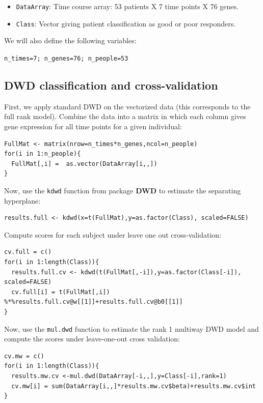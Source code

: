 \documentclass[]{article}
\begin{document}
\begin{itemize}
\itemsep1pt\parskip0pt
\item
  \texttt{DataArray}: Time course array: 53 patients X 7 time points X
  76 genes.
\item
  \texttt{Class}: Vector giving patient classification as good or poor
  responders.
\end{itemize}

We will also define the following variables:

\texttt{n\_times=7; n\_genes=76; n\_people=53}

\subsection{DWD classification and
cross-validation}\label{dwd-classification-and-cross-validation}

First, we apply standard DWD on the vectorized data (this corresponds to
the full rank model). Combine the data into a matrix in which each
column gives gene expression for all time points for a given individual:

\begin{verbatim}
FullMat <- matrix(nrow=n_times*n_genes,ncol=n_people)
for(i in 1:n_people){
  FullMat[,i] =  as.vector(DataArray[i,,])
}
\end{verbatim}

Now, use the \texttt{kdwd} function from package \textbf{DWD} to
estimate the separating hyperplane:

\begin{verbatim}
results.full <- kdwd(x=t(FullMat),y=as.factor(Class), scaled=FALSE)
\end{verbatim}

Compute scores for each subject under leave one out cross-validation:

\begin{verbatim}
cv.full = c()
for(i in 1:length(Class)){
  results.full.cv <- kdwd(t(FullMat[,-i]),y=as.factor(Class[-i]), scaled=FALSE)
  cv.full[i] = t(FullMat[,i]) %*%results.full.cv@w[[1]]+results.full.cv@b0[[1]]
}
\end{verbatim}

Now, use the \texttt{mul.dwd} function to estimate the rank 1 multiway
DWD model and compute the scores under leave-one-out cross validation:

\begin{verbatim}
cv.mw = c()
for(i in 1:length(Class)){
  results.mw.cv <-mul.dwd(DataArray[-i,,],y=Class[-i],rank=1)
  cv.mw[i] = sum(DataArray[i,,]*results.mw.cv$beta)+results.mw.cv$int
}
\end{verbatim}
\end{document}

